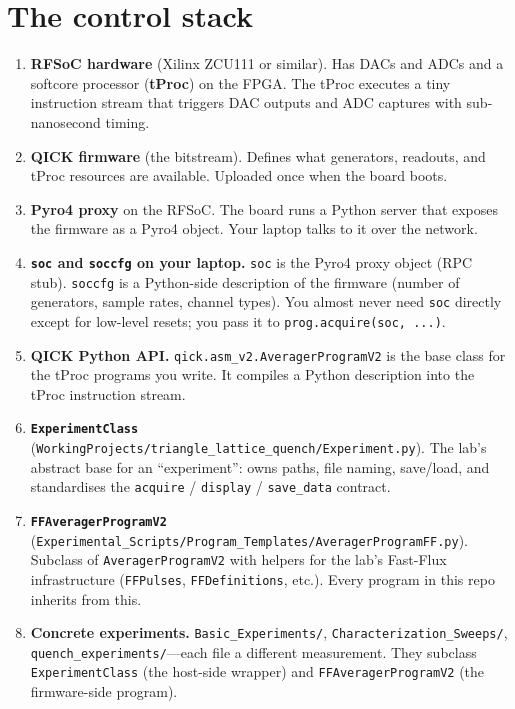 \documentclass[11pt,letterpaper]{article}
\begin{document}
\section{The control stack}
\begin{enumerate}[leftmargin=*]
  \item \textbf{RFSoC hardware} (Xilinx ZCU111 or similar). Has DACs and ADCs and a softcore processor (\textbf{tProc}) on the FPGA. The tProc executes a tiny instruction stream that triggers DAC outputs and ADC captures with sub-nanosecond timing.
  \item \textbf{QICK firmware} (the bitstream). Defines what generators, readouts, and tProc resources are available. Uploaded once when the board boots.
  \item \textbf{Pyro4 proxy} on the RFSoC. The board runs a Python server that exposes the firmware as a Pyro4 object. Your laptop talks to it over the network.
  \item \textbf{\texttt{soc} and \texttt{soccfg} on your laptop.} \texttt{soc} is the Pyro4 proxy object (RPC stub). \texttt{soccfg} is a Python-side description of the firmware (number of generators, sample rates, channel types). You almost never need \texttt{soc} directly except for low-level resets; you pass it to \texttt{prog.acquire(soc, ...)}.
  \item \textbf{QICK Python API.} \verb|qick.asm_v2.AveragerProgramV2| is the base class for the tProc programs you write. It compiles a Python description into the tProc instruction stream.
  \item \textbf{\texttt{ExperimentClass}} (\texttt{WorkingProjects/triangle\_lattice\_quench/Experiment.py}). The lab's abstract base for an ``experiment'': owns paths, file naming, save/load, and standardises the \texttt{acquire} / \texttt{display} / \texttt{save\_data} contract.
  \item \textbf{\texttt{FFAveragerProgramV2}} (\texttt{Experimental\_Scripts/Program\_Templates/AveragerProgramFF.py}). Subclass of \texttt{AveragerProgramV2} with helpers for the lab's Fast-Flux infrastructure (\texttt{FFPulses}, \texttt{FFDefinitions}, etc.). Every program in this repo inherits from this.
  \item \textbf{Concrete experiments.} \texttt{Basic\_Experiments/}, \texttt{Characterization\_Sweeps/}, \texttt{quench\_experiments/}---each file a different measurement. They subclass \texttt{ExperimentClass} (the host-side wrapper) and \texttt{FFAveragerProgramV2} (the firmware-side program).
\end{enumerate}
\end{document}
